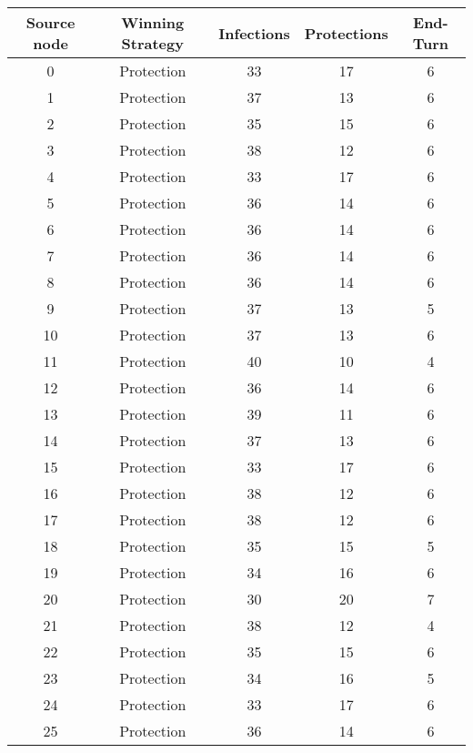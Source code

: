 \documentclass[results.tex]{subfiles}
\begin{document}
\begin{center}
  \begin{tabular}{| c || c | c | c | c |}
    \hline
    {\bfseries Source node} & {\bfseries Winning Strategy} & {\bfseries Infections} & {\bfseries Protections} & {\bfseries End-Turn} \\  %
    \hline\hline
    0 & Protection & 33 & 17 & 6 \\ 
    \hline
    1 & Protection & 37 & 13 & 6 \\ 
    \hline
    2 & Protection & 35 & 15 & 6 \\ 
    \hline
    3 & Protection & 38 & 12 & 6 \\ 
    \hline
    4 & Protection & 33 & 17 & 6 \\ 
    \hline
    5 & Protection & 36 & 14 & 6 \\ 
    \hline
    6 & Protection & 36 & 14 & 6 \\ 
    \hline
    7 & Protection & 36 & 14 & 6 \\ 
    \hline
    8 & Protection & 36 & 14 & 6 \\ 
    \hline
    9 & Protection & 37 & 13 & 5 \\ 
    \hline
    10 & Protection & 37 & 13 & 6 \\ 
    \hline
    11 & Protection & 40 & 10 & 4 \\ 
    \hline
    12 & Protection & 36 & 14 & 6 \\ 
    \hline
    13 & Protection & 39 & 11 & 6 \\ 
    \hline
    14 & Protection & 37 & 13 & 6 \\ 
    \hline
    15 & Protection & 33 & 17 & 6 \\ 
    \hline
    16 & Protection & 38 & 12 & 6 \\ 
    \hline
    17 & Protection & 38 & 12 & 6 \\ 
    \hline
    18 & Protection & 35 & 15 & 5 \\ 
    \hline
    19 & Protection & 34 & 16 & 6 \\ 
    \hline
    20 & Protection & 30 & 20 & 7 \\ 
    \hline
    21 & Protection & 38 & 12 & 4 \\ 
    \hline
    22 & Protection & 35 & 15 & 6 \\ 
    \hline
    23 & Protection & 34 & 16 & 5 \\ 
    \hline
    24 & Protection & 33 & 17 & 6 \\ 
    \hline
    25 & Protection & 36 & 14 & 6 \\ 

\end{tabular}
\end{center}
\end{document}
